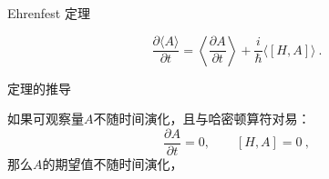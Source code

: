 

\begin{theorem}{Ehrenfest 定理}
\end{theorem}
\begin{equation}
\frac{\partial\langle A\rangle}{\partial t}=\left\langle\frac{\partial A}{\partial t}\right\rangle+\frac{i}{\hbar}\langle[H, A]\rangle~.
\end{equation}
\begin{issues}
\issueTODO 定理的推导
\end{issues}

如果可观察量$A$不随时间演化，且与哈密顿算符对易：
\begin{equation}
\frac{\partial A}{\partial t}=0,\qquad[H, A]=0~,
\end{equation}
那么$A$的期望值不随时间演化，
